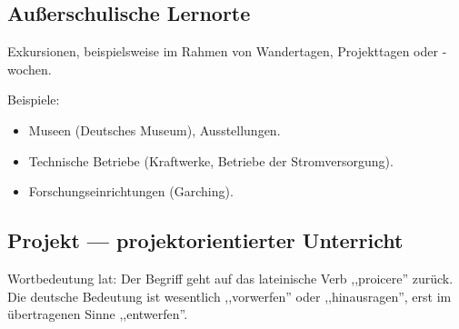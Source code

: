 \subsection{Au{\ss}erschulische Lernorte}

Exkursionen, beispielsweise im Rahmen von Wandertagen,
Projekttagen oder -wochen.

Beispiele:
\begin{itemize}
\item Museen (Deutsches Museum), Ausstellungen.
\item Technische Betriebe
(Kraftwerke, Betriebe der Stromversorgung).
\item Forschungseinrichtungen (Garching).
\end{itemize}


\subsection{Projekt --- projektorientierter Unterricht}

Wortbedeutung lat: Der Begriff geht auf das lateinische Verb
,,proicere'' zur\"{u}ck.
Die deutsche Bedeutung ist wesentlich ,,vorwerfen'' oder
,,hinausragen'', erst im \"{u}bertragenen Sinne ,,entwerfen''.

